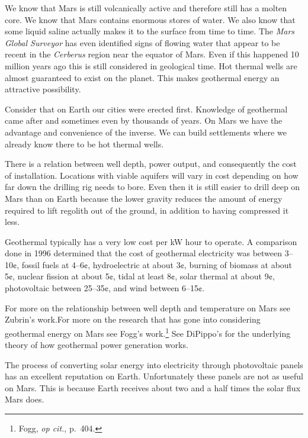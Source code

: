 We know that Mars is still volcanically active and therefore still has a molten core. We know that Mars contains enormous stores of water. We also know that some liquid saline actually makes it to the surface from time to time. The {\it Mars Global Surveyor} has even identified signs of flowing water that appear to be recent in the {\it Cerberus} region near the equator of Mars. Even if this happened 10 million years ago this is still considered  in geological time. Hot thermal wells are almost guaranteed to exist on the planet. This makes geothermal energy an attractive possibility.

Consider that on Earth our cities were erected first. Knowledge of geothermal came after and sometimes even by thousands of years. On Mars we have the advantage and convenience of the inverse. We can build settlements where we already know there to be hot thermal wells.

There is a relation between well depth, power output, and consequently the cost of installation. Locations with viable aquifers will vary in cost depending on how far down the drilling rig needs to bore. Even then it is still easier to drill deep on Mars than on Earth because the lower gravity reduces the amount of energy required to lift regolith out of the ground, in addition to having compressed it less.

Geothermal typically has a very low cost per kW hour to operate. A comparison done in 1996 determined that the cost of geothermal electricity was between 3--10¢, fossil fuels at 4--6¢, hydroelectric at about 3¢, burning of biomass at about 5¢, nuclear fission at about 5¢, tidal at least 8¢, solar thermal at about 9¢, photovoltaic between 25--35¢, and wind between 6--15¢.\footnotecite[fogg1996]

For more on the relationship between well depth and temperature on Mars see Zubrin's work. For more on the research that has gone into considering geothermal energy on Mars see Fogg's work.\footnote{Fogg, {\it op cit.}, p.~404.} See DiPippo's for the underlying theory of how geothermal power generation works.\footnotecite[dipippo2012]

The process of converting solar energy into electricity through photovoltaic panels has an excellent reputation on Earth. Unfortunately these panels are not as useful on Mars. This is because Earth receives about two and a half times the solar flux Mars does.

